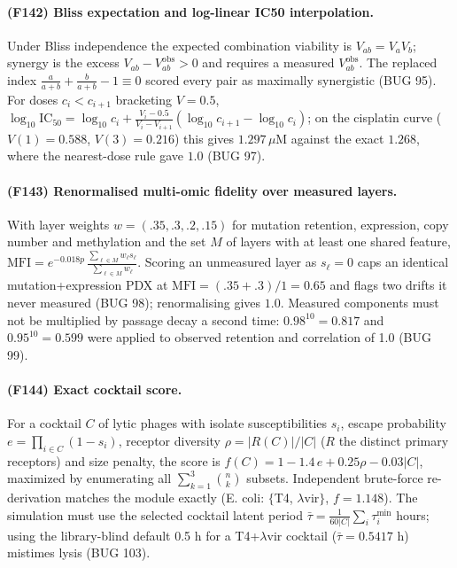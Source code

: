 \paragraph{(F142) Bliss expectation and log-linear IC50 interpolation.} Under Bliss independence the expected combination viability is $V_{ab}=V_aV_b$; synergy is the excess $V_{ab}-V_{ab}^{\mathrm{obs}}>0$ and requires a measured $V_{ab}^{\mathrm{obs}}$. The replaced index $\frac{a}{a+b}+\frac{b}{a+b}-1\equiv0$ scored every pair as maximally synergistic (BUG 95). For doses $c_i<c_{i+1}$ bracketing $V=0.5$, $\log_{10}\mathrm{IC}_{50}=\log_{10}c_i+\frac{V_i-0.5}{V_i-V_{i+1}}(\log_{10}c_{i+1}-\log_{10}c_i)$; on the cisplatin curve ($V(1)=0.588$, $V(3)=0.216$) this gives $1.297\,\mu$M against the exact $1.268$, where the nearest-dose rule gave $1.0$ (BUG 97).
\paragraph{(F143) Renormalised multi-omic fidelity over measured layers.} With layer weights $w=(.35,.3,.2,.15)$ for mutation retention, expression, copy number and methylation and the set $M$ of layers with at least one shared feature, $\mathrm{MFI}=e^{-0.018p}\,\frac{\sum_{\ell\in M}w_\ell s_\ell}{\sum_{\ell\in M}w_\ell}$. Scoring an unmeasured layer as $s_\ell=0$ caps an identical mutation+expression PDX at $\mathrm{MFI}=(.35+.3)/1=0.65$ and flags two drifts it never measured (BUG 98); renormalising gives $1.0$. Measured components must not be multiplied by passage decay a second time: $0.98^{10}=0.817$ and $0.95^{10}=0.599$ were applied to observed retention and correlation of 1.0 (BUG 99).
\paragraph{(F144) Exact cocktail score.} For a cocktail $C$ of lytic phages with isolate susceptibilities $s_i$, escape probability $e=\prod_{i\in C}(1-s_i)$, receptor diversity $\rho=|R(C)|/|C|$ ($R$ the distinct primary receptors) and size penalty, the score is $f(C)=1-1.4\,e+0.25\rho-0.03|C|$, maximized by enumerating all $\sum_{k=1}^{3}\binom{n}{k}$ subsets. Independent brute-force re-derivation matches the module exactly (E. coli: $\{$T4, $\lambda$vir$\}$, $f=1.148$). The simulation must use the selected cocktail latent period $\bar\tau=\frac{1}{60|C|}\sum_i \tau_i^{\min}$ hours; using the library-blind default 0.5 h for a T4+$\lambda$vir cocktail ($\bar\tau=0.5417$ h) mistimes lysis (BUG 103).
